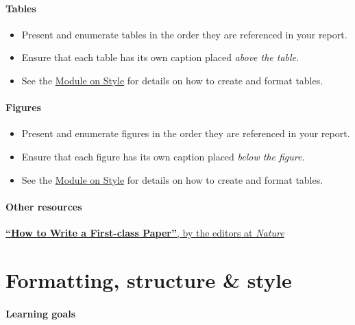 \documentclass[
]{book}
\begin{document}
\hypertarget{tables-1}{%
\subsubsection*{Tables}\label{tables-1}}

\begin{itemize}
\item
  Present and enumerate tables in the order they are referenced in your report.
\item
  Ensure that each table has its own caption placed \emph{above the table}.
\item
  See the \protect\hyperlink{style}{Module on Style} for details on how to create and format tables.
\end{itemize}

\hypertarget{figures-1}{%
\subsubsection*{Figures}\label{figures-1}}

\begin{itemize}
\item
  Present and enumerate figures in the order they are referenced in your report.
\item
  Ensure that each figure has its own caption placed \emph{below the figure}.
\item
  See the \protect\hyperlink{style}{Module on Style} for details on how to create and format tables.
\end{itemize}

\hypertarget{other-resources-3}{%
\subsubsection*{Other resources}\label{other-resources-3}}

\href{https://www.nature.com/articles/d41586-018-02404-4}{\textbf{``How to Write a First-class Paper''}, by the editors at \emph{Nature}}

\hypertarget{style}{%
\chapter{Formatting, structure \& style}\label{style}}

\hypertarget{learning-goals-24}{%
\subsubsection*{Learning goals}\label{learning-goals-24}}
\end{document}
